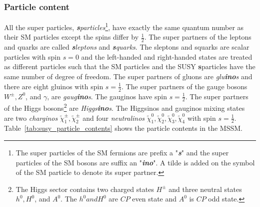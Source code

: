 \subsubsection{Particle content}
\label{subsubsec:susy_particle_content}
All the super particles, \textit{\textbf{s}particles}\footnote{The super particles of the SM fermions are prefix a "\textit{\textbf{s}}" and the super particles of the SM bosons are suffix an "\textit{\textbf{ino}}". A tilde is added on the symbol of the SM particle to denote its super partner.}, have exactly the same quantum number as their SM particles except the spins differ by $\frac{1}{2}$.
The super partners of the leptons and quarks are called \textit{\textbf{s}leptons} and \textit{\textbf{s}quarks}.
The sleptons and squarks are scalar particles with spin $s=0$ and the left-handed and right-handed states are treated as different particles such that the SM particles and the SUSY \textbf{s}particles have the same number of degree of freedom.
The super partners of gluons are \textit{glu\textbf{ino}s} and there are eight gluinos with spin $s=\frac{1}{2}$. 
The super partners of the gauge bosons $W^{\pm}, Z^{0}$, and $\gamma$, are \textit{gaug\textbf{ino}s}.
The gauginos have spin $s = \frac{1}{2}$.
The super partners of the Higgs bosons\footnote{The Higgs sector contains two charged states $H^{\pm}$ and three neutral states $h^{0}, H^{0}$, and $A^{0}$. The $h^{0} and H^{0}$ are $CP$ even state and $A^{0}$ is $CP$ odd state.} are \textit{Higgs\textbf{ino}s}.
The Higgsinos and gauginos mixing states are two \textit{charginos} $\tilde{\chi}_{1}^{\pm}, \tilde{\chi}_{2}^{\pm}$ and four \textit{neutralinos} $\tilde{\chi}_{1}^{0}, \tilde{\chi}_{2}^{0}, \tilde{\chi}_{3}^{0}, \tilde{\chi}_{4}^{0}$ with spin $s=\frac{1}{2}$.
Table~\ref{tab:susy_particle_contents} shows the particle contents in the MSSM.

